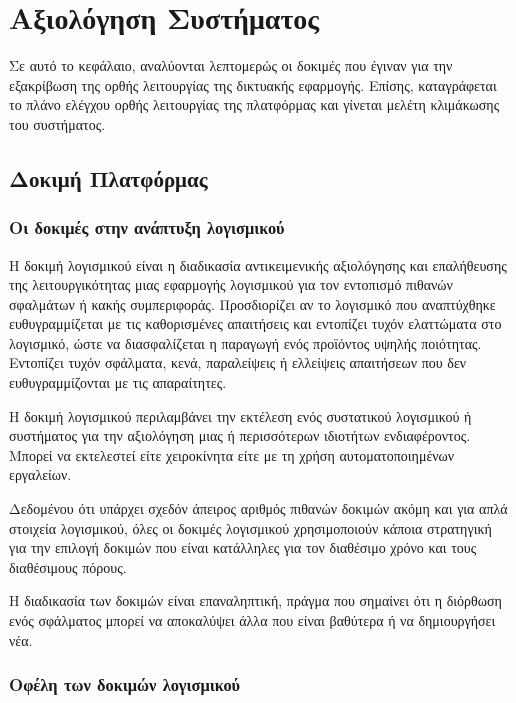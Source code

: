 \chapter{Αξιολόγηση Συστήματος}
Σε αυτό το κεφάλαιο, αναλύονται λεπτομερώς οι δοκιμές που έγιναν για την εξακρίβωση της ορθής λειτουργίας της δικτυακής εφαρμογής. Επίσης, καταγράφεται το πλάνο ελέγχου ορθής λειτουργίας της πλατφόρμας και γίνεται μελέτη κλιμάκωσης του συστήματος.

\section{Δοκιμή Πλατφόρμας}
\subsection{Οι δοκιμές στην ανάπτυξη λογισμικού}
Η δοκιμή λογισμικού είναι η διαδικασία αντικειμενικής αξιολόγησης και επαλήθευσης της λειτουργικότητας μιας εφαρμογής λογισμικού για τον εντοπισμό πιθανών σφαλμάτων ή κακής συμπεριφοράς. Προσδιορίζει αν το λογισμικό που αναπτύχθηκε ευθυγραμμίζεται με τις καθορισμένες απαιτήσεις και εντοπίζει τυχόν ελαττώματα στο λογισμικό, ώστε να διασφαλίζεται η παραγωγή ενός προϊόντος υψηλής ποιότητας. Εντοπίζει τυχόν σφάλματα, κενά, παραλείψεις ή ελλείψεις απαιτήσεων που δεν ευθυγραμμίζονται με τις απαραίτητες.

Η δοκιμή λογισμικού περιλαμβάνει την εκτέλεση ενός συστατικού λογισμικού ή συστήματος για την αξιολόγηση μιας ή περισσότερων ιδιοτήτων ενδιαφέροντος. Μπορεί να εκτελεστεί είτε χειροκίνητα είτε με τη χρήση αυτοματοποιημένων εργαλείων.

Δεδομένου ότι υπάρχει σχεδόν άπειρος αριθμός πιθανών δοκιμών ακόμη και για απλά στοιχεία λογισμικού, όλες οι δοκιμές λογισμικού χρησιμοποιούν κάποια στρατηγική για την επιλογή δοκιμών που είναι κατάλληλες για τον διαθέσιμο χρόνο και τους διαθέσιμους πόρους.

Η διαδικασία των δοκιμών είναι επαναληπτική, πράγμα που σημαίνει ότι η διόρθωση ενός σφάλματος μπορεί να αποκαλύψει άλλα που είναι βαθύτερα ή να δημιουργήσει νέα.

\subsection{Οφέλη των δοκιμών λογισμικού} 

